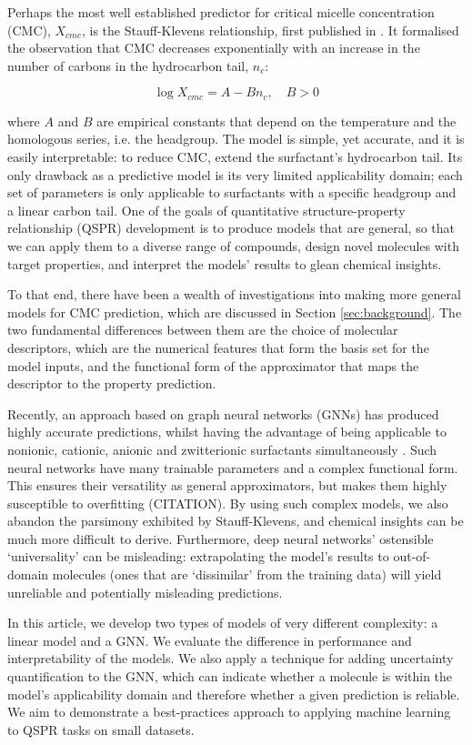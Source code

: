 Perhaps the most well established predictor for critical micelle concentration
(CMC), $X_{cmc}$, is the Stauff-Klevens relationship, first published in
\citeyear{klevensStructureAggregationDilate1953}
\cite{klevensStructureAggregationDilate1953}. It formalised the observation that
CMC decreases exponentially with an increase in the number of carbons in the
hydrocarbon tail, $n_c$:

\begin{equation}
    \label{eq:klevens}
    \log X_{cmc} = A - Bn_c, \quad B > 0
\end{equation}

where $A$ and $B$ are empirical constants that depend on the temperature and the
homologous series, i.e. the headgroup. The model is simple, yet accurate, and it
is easily interpretable: to reduce CMC, extend the surfactant's hydrocarbon
tail. Its only drawback as a predictive model is its very limited applicability
domain; each set of parameters is only applicable to surfactants with a specific
headgroup and a linear carbon tail. One of the goals of quantitative
structure-property relationship (QSPR) development is to produce models that are
general, so that we can apply them to a diverse range of compounds, design novel
molecules with target properties, and interpret the models' results to glean
chemical insights.

To that end, there have been a wealth of investigations into making more general
models for CMC prediction, which are discussed in Section \ref{sec:background}.
The two fundamental differences between them are the choice of molecular
descriptors, which are the numerical features that form the basis set for the
model inputs, and the functional form of the approximator that maps the
descriptor to the property prediction. 

Recently, an approach based on graph neural networks (GNNs) has produced highly
accurate predictions, whilst having the advantage of being applicable to
nonionic, cationic, anionic and zwitterionic surfactants simultaneously
\cite{qinPredictingCriticalMicelle2021}. Such neural networks have many
trainable parameters and a complex functional form. This ensures their
versatility as general approximators, but makes them highly susceptible to
overfitting (CITATION). By using such complex models, we also abandon the
parsimony exhibited by Stauff-Klevens, and chemical insights can be much more
difficult to derive. Furthermore, deep neural networks' ostensible
`universality' can be misleading: extrapolating the model's results to
out-of-domain molecules (ones that are `dissimilar' from the training data) will
yield unreliable and potentially misleading predictions.

In this article, we develop two types of models of very different complexity: a
linear model and a GNN. We evaluate the difference in performance and
interpretability of the models. We also apply a technique for adding uncertainty
quantification to the GNN, which can indicate whether a molecule is within the
model's applicability domain and therefore whether a given prediction is
reliable. We aim to demonstrate a best-practices approach to applying machine
learning to QSPR tasks on small datasets.
